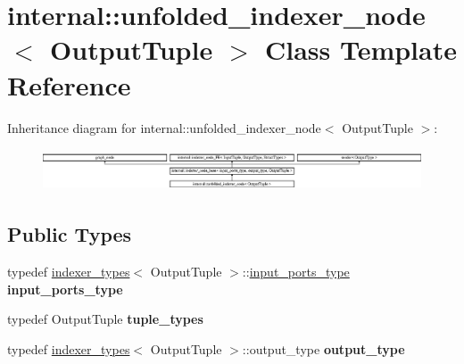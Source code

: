 \hypertarget{classinternal_1_1unfolded__indexer__node}{}\section{internal\+:\+:unfolded\+\_\+indexer\+\_\+node$<$ Output\+Tuple $>$ Class Template Reference}
\label{classinternal_1_1unfolded__indexer__node}
Inheritance diagram for internal\+:\+:unfolded\+\_\+indexer\+\_\+node$<$ Output\+Tuple $>$\+:\begin{figure}[H]
\begin{center}
\leavevmode
\includegraphics[height=1.252796cm]{classinternal_1_1unfolded__indexer__node}
\end{center}
\end{figure}
\subsection*{Public Types}
\begin{DoxyCompactItemize}
\item 
\hypertarget{classinternal_1_1unfolded__indexer__node_a1e66a4bfb6767d82f60f55164a1c10e1}{}typedef \hyperlink{structinternal_1_1indexer__types}{indexer\+\_\+types}$<$ Output\+Tuple $>$\+::\hyperlink{classinternal_1_1indexer__node__FE}{input\+\_\+ports\+\_\+type} {\bfseries input\+\_\+ports\+\_\+type}\label{classinternal_1_1unfolded__indexer__node_a1e66a4bfb6767d82f60f55164a1c10e1}

\item 
\hypertarget{classinternal_1_1unfolded__indexer__node_a39af9adcadcdf5b19749ac3147780a29}{}typedef Output\+Tuple {\bfseries tuple\+\_\+types}\label{classinternal_1_1unfolded__indexer__node_a39af9adcadcdf5b19749ac3147780a29}

\item 
\hypertarget{classinternal_1_1unfolded__indexer__node_a602b56d2b2e8de41d546e3752c61c4c2}{}typedef \hyperlink{structinternal_1_1indexer__types}{indexer\+\_\+types}$<$ Output\+Tuple $>$\+::output\+\_\+type {\bfseries output\+\_\+type}\label{classinternal_1_1unfolded__indexer__node_a602b56d2b2e8de41d546e3752c61c4c2}

\end{DoxyCompactItemize}
